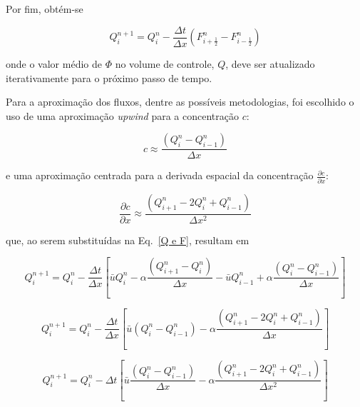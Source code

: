 Por fim, obtém-se

\begin{equation}\label{Q e F}
    Q_i^{n+1} = Q_i^n - \frac{\Delta t}{\Delta x}(F_{i+\frac{1}{2}}^n -
    F_{i-\frac{1}{2}}^n)
\end{equation}

\noindent onde o valor médio de $\Phi$ no volume de controle, $Q$, deve
ser atualizado iterativamente para o próximo passo de tempo.

Para a aproximação dos fluxos, dentre as possíveis metodologias, foi escolhido o
uso de uma aproximação \emph{upwind} para a concentração $c$:

\begin{equation}
    c \approx \frac{(Q_i^n - Q_{i-1}^n)}{\Delta x}
\end{equation}

\noindent e uma aproximação
centrada para a derivada espacial da concentração $\frac{\partial c}{\partial
x}$:

\begin{equation}
    \frac{\partial c}{\partial x} \approx \frac{(Q_{i+1}^n - 2Q_i^n +
    Q_{i-1}^n)}{\Delta x^2}
\end{equation}

\noindent que, ao serem substituídas na Eq.\ \ref{Q e F}, resultam em

\begin{equation*}
     Q_i^{n+1} = Q_i^n - \frac{\Delta t}{\Delta x} \left[
     \bar{u}Q_i^n - \alpha\frac{(Q_{i+1}^n - Q_i^n)}{\Delta x}
     - \bar{u}Q_{i-1}^n + \alpha\frac{(Q_i^n - Q_{i-1}^n)}{\Delta x}
     \right]
\end{equation*}

\begin{equation*}
    Q_i^{n+1} = Q_i^n - \frac{\Delta t}{\Delta x} \left[
    \bar{u}(Q_i^n - Q_{i-1}^n) - \alpha\frac{(Q_{i+1}^n - 2Q_i^n +
    Q_{i-1}^n)}{\Delta x}
    \right]
\end{equation*}

\begin{equation}\label{eq. final}
    Q_i^{n+1} = Q_i^n - \Delta t \left[
    \bar{u}\frac{(Q_i^n - Q_{i-1}^n)}{\Delta x} - \alpha\frac{(Q_{i+1}^n -
    2Q_i^n + Q_{i-1}^n)}{\Delta x^2}
    \right]
\end{equation}